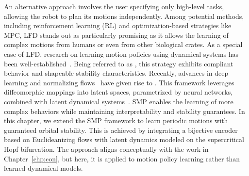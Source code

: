 \begin{foreword}
    An alternative approach involves the user specifying only high-level tasks, allowing the robot to plan its motions independently. Among potential methods, including reinforcement learning (RL) and optimization-based strategies like \gls{MPC}, \gls{LFD} stands out as particularly promising as it allows the learning of complex motions from humans or even from other biological crates. As a special case of \gls{LFD}, research on learning motion policies using dynamical systems has been well-established~\citep{ijspeert2013dynamical}. Being referred to as , this strategy exhibits compliant behavior and shapeable stability characteristics. Recently, advances in deep learning and normalizing flows~\citep{kobyzev2020normalizing} have given rise to . This framework leverages diffeomorphic mappings into latent spaces, parametrized by neural networks, combined with latent dynamical systems~\citep{rana2020euclideanizing, perez2023stable, zhi2024teaching}. \gls{SMP} enables the learning of more complex behaviors while maintaining interpretability and stability guarantees.
    In this chapter, we extend the \gls{SMP} framework to learn periodic motions with guaranteed orbital stability. This is achieved by integrating a bijective encoder based on Euclideanizing flows with latent dynamics modeled on the supercritical Hopf bifurcation. The approach aligns conceptually with the work in Chapter~\ref{chp:con}, but here, it is applied to motion policy learning rather than learned dynamical models.
\end{foreword}


\pagebreak

